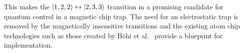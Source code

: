 This makes the $\ket{1,2,2} \leftrightarrow \ket{2,3,3}$  transition in \CaF{} a
promising candidate for quantum control in a magnetic chip trap. The need for an
electrostatic trap is removed by the magnetically insensitive transitions and
the existing atom chip technologies such as those created by B\"ohi et
al.~\cite{Boehi2009} provide a blueprint for implementation.
